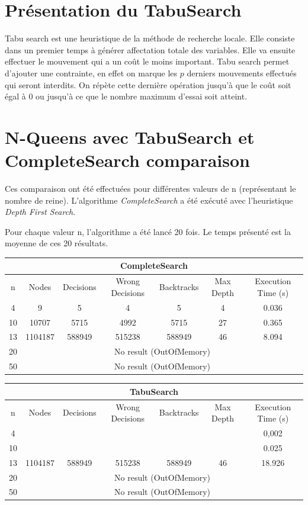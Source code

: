 \documentclass[a4paper,10pt]{article}
\begin{document}
\section{Présentation du TabuSearch}
Tabu search est une heuristique de la méthode de recherche locale. Elle consiste dans un premier temps à générer affectation totale des variables. Elle va ensuite effectuer le mouvement qui a un coût le moins important. Tabu search permet d'ajouter une contrainte, en effet on marque les $p$ derniers mouvements effectués qui seront interdits. On répète cette dernière opération jusqu'à que le coût soit égal à 0 ou jusqu'à ce que le nombre maximum d'essai soit atteint.

\section{N-Queens avec TabuSearch et CompleteSearch comparaison}

Ces comparaison ont été effectuées pour différentes valeurs de n (représentant le nombre de reine). L'algorithme \emph{CompleteSearch} a été exécuté avec l'heuristique \emph{Depth First Search}.

Pour chaque valeur n, l'algorithme a été lancé 20 fois. Le temps présenté est la moyenne de ces 20 résultats.
\vspace{0.3cm}

\begin{tabular}{|c|c|c|c|c|c|c|}
\hline
\multicolumn{7}{|c|}{CompleteSearch}\\
\hline
n & Nodes & Decisions & Wrong Decisions & Backtracks & Max Depth & Execution Time (s) \\
\hline
4 & 9 & 5 & 4 & 5 & 4 & 0.036\\
\hline
10 & 10707 & 5715 & 4992 & 5715 & 27 & 0.365\\
\hline
13 & 1104187 & 588949 & 515238 & 588949 & 46 & 8.094\\
\hline
20 & \multicolumn{6}{c|}{No result (OutOfMemory)}\\
\hline
50 & \multicolumn{6}{c|}{No result (OutOfMemory)}\\
\hline
\end{tabular}

\vspace{0.3cm}
\begin{tabular}{|c|c|c|c|c|c|c|}
\hline
\multicolumn{7}{|c|}{TabuSearch}\\
\hline
n & Nodes & Decisions & Wrong Decisions & Backtracks & Max Depth & Execution Time (s) \\
\hline
4 &  &  &  &  &  & 0,002\\
\hline
10 &  &  &  &  &  & 0.025\\
\hline
13 & 1104187 & 588949 & 515238 & 588949 & 46 & 18.926\\
\hline
20 & \multicolumn{6}{c|}{No result (OutOfMemory)}\\
\hline
50 & \multicolumn{6}{c|}{No result (OutOfMemory)}\\
\hline
\end{tabular}
\end{document}

